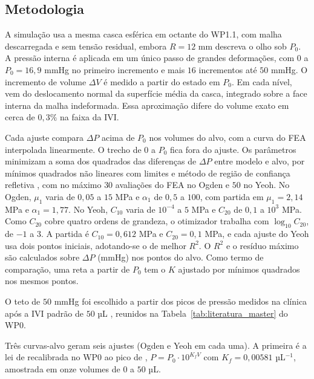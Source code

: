 \subsection{Metodologia}
\label{sec:wp12_metodologia}

A simulação usa a mesma casca esférica em octante do WP1.1, com malha descarregada e sem tensão residual, embora $R=12$ mm descreva o olho sob $P_0$. A pressão interna é aplicada em um único passo de grandes deformações, com $0$ a $P_0=16{,}9$ mmHg no primeiro incremento e mais $16$ incrementos até $50$ mmHg. O incremento de volume $\Delta V$ é medido a partir do estado em $P_0$. Em cada nível, vem do deslocamento normal da superfície média da casca, integrado sobre a face interna da malha indeformada. Essa aproximação difere do volume exato em cerca de $0{,}3\%$ na faixa da IVI.

Cada ajuste compara $\Delta P$ acima de $P_0$ nos volumes do alvo, com a curva do FEA interpolada linearmente. O trecho de $0$ a $P_0$ fica fora do ajuste. Os parâmetros minimizam a soma dos quadrados das diferenças de $\Delta P$ entre modelo e alvo, por mínimos quadrados não lineares com limites e método de região de confiança refletiva \citep{branch1999,virtanen2020scipy}, com no máximo $30$ avaliações do FEA no Ogden e $50$ no Yeoh. No Ogden, $\mu_1$ varia de $0{,}05$ a $15$ MPa e $\alpha_1$ de $0{,}5$ a $100$, com partida em $\mu_1=2{,}14$ MPa e $\alpha_1=1{,}77$. No Yeoh, $C_{10}$ varia de $10^{-4}$ a $5$ MPa e $C_{20}$ de $0{,}1$ a $10^{3}$ MPa. Como $C_{20}$ cobre quatro ordens de grandeza, o otimizador trabalha com $\log_{10}C_{20}$, de $-1$ a $3$. A partida é $C_{10}=0{,}612$ MPa e $C_{20}=0{,}1$ MPa, e cada ajuste do Yeoh usa dois pontos iniciais, adotando-se o de melhor $R^2$. O $R^2$ e o resíduo máximo são calculados sobre $\Delta P$ (mmHg) nos pontos do alvo. Como termo de comparação, uma reta a partir de $P_0$ tem o $K$ ajustado por mínimos quadrados nos mesmos pontos.


 
O teto de $50$ mmHg foi escolhido a partir dos picos de pressão medidos na clínica após a IVI padrão de $50$ µL \citep{knecht2009, sharei2010}, reunidos na Tabela~\ref{tab:literatura_master} do WP0.
 
Três curvas-alvo geram seis ajustes (Ogden e Yeoh em cada uma). A primeira é a lei de \citet{friedenwald1937} recalibrada no WP0 ao pico de \citet{knecht2009}, $P=P_0\cdot10^{K_fV}$ com $K_f=0{,}00581$ µL$^{-1}$, amostrada em onze volumes de $0$ a $50$ µL.


